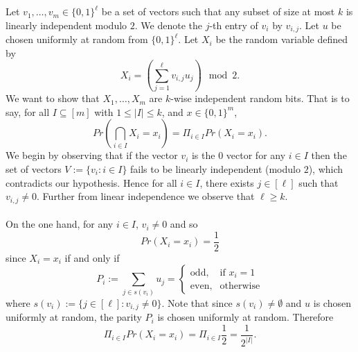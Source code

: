 \documentclass[letterpaper,12pt,oneside,onecolumn]{article}
\begin{document}
\section{}
\paragraph{}
Let $v_1, \dots, v_m \in \{0,1\}^\ell$ be a set of vectors such that any subset of size at most $k$ is linearly independent modulo $2$. We denote the $j$-th entry of $v_i$ by $v_{i,j}$. Let $u$ be chosen uniformly at random from $\{0,1\}^\ell$. Let $X_i$ be the random variable defined by
$$X_i = (\sum_{j=1}^\ell v_{i,j}u_j) \mod 2.$$
We want to show that $X_1, \dots, X_m$ are $k$-wise independent random bits. That is to say, for all $I \subseteq [m]$ with $1\leq |I| \leq k$, and $x \in \{0,1\}^m$,
$$Pr(\bigcap_{i\in I} X_i = x_i) = \Pi_{i\in I} Pr(X_i = x_i).$$
We begin by observing that if the vector $v_i$ is the $0$ vector for any $i \in I$ then the set of vectors $V := \{v_i : i \in I\}$ fails to be linearly independent (modulo $2$), which contradicts our hypothesis. Hence for all $i \in I$, there exists $j \in [\ell]$ such that $v_{i,j} \neq 0$. Further from linear independence we observe that $\ell \geq k$.
\paragraph{}
On the one hand, for any $i \in I$, $v_i \neq 0$ and so
$$Pr(X_i = x_i) = \frac{1}{2}$$
since $X_i = x_i$ if and only if
$$P_i := \sum_{j \in s(v_i)} u_j = \begin{cases} \text{odd}, &\text{if $x_i = 1$} \\
\text{even}, &\text{otherwise}
\end{cases}$$
where $s(v_i) := \{j \in [\ell] : v_{i,j} \neq 0\}$. Note that since $s(v_i) \neq \emptyset$ and $u$ is chosen uniformly at random, the parity $P_i$ is chosen uniformly at random. Therefore
$$\Pi_{i \in I} Pr(X_i = x_i) = \Pi_{i \in I} \frac{1}{2} = \frac{1}{2^{|I|}}.$$
\end{document}
